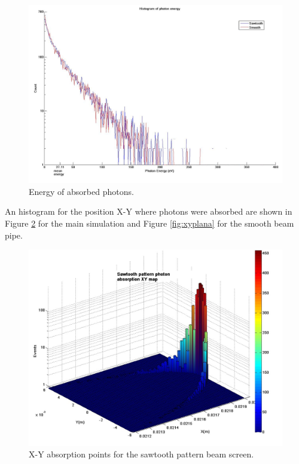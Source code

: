 \begin{figure}%
  	\centering
   	\includegraphics[width=6.5in, height=.65\textheight]{Graficas/nuevas/energias.jpg}
  		\caption{\label{fig:energia}
   			Energy of absorbed photons. }
\end{figure}



An histogram for the position X-Y where photons were absorbed are shown in Figure \ref{fig:xy} for the main simulation and Figure \ref{fig:xyplana} for the smooth beam pipe. 
\begin{figure}

  	\centering
   	\includegraphics[height=.45\textheight]{Graficas/nuevas/xy.jpg}
  		\caption{\label{fig:xy}
   			 X-Y absorption points for the sawtooth pattern beam screen.}
\end{figure}   

